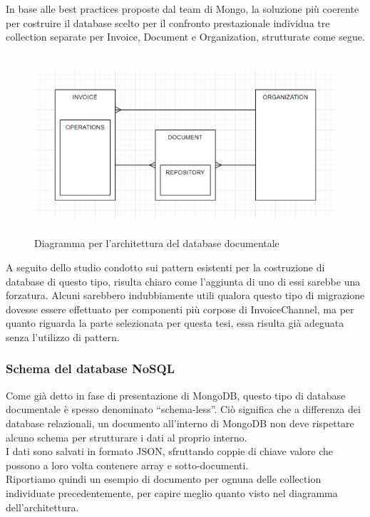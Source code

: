 \noindent In base alle best practices proposte dal team di Mongo, la soluzione più coerente per costruire il database scelto per il confronto prestazionale individua tre collection separate per Invoice, Document e Organization, strutturate come segue.\\

\begin{figure}[htbp]
\begin{center}
\includegraphics[height=18em]{immagini/ER-Mongo-IC.png}
\caption{Diagramma per l'architettura del database documentale}
\end{center}
\end{figure}

\noindent A seguito dello studio condotto sui pattern esistenti per la costruzione di database di questo tipo, risulta chiaro come l'aggiunta di uno di essi sarebbe una forzatura. Alcuni sarebbero indubbiamente utili qualora questo tipo di migrazione dovesse essere effettuato per componenti più corpose di InvoiceChannel, ma per quanto riguarda la parte selezionata per questa tesi, essa risulta già adeguata senza l'utilizzo di pattern.

\subsubsection{Schema del database NoSQL}
Come già detto in fase di presentazione di MongoDB, questo tipo di database documentale è spesso denominato ``schema-less''. Ciò significa che a differenza dei database relazionali, un documento all'interno di MongoDB non deve rispettare alcuno schema per strutturare i dati al proprio interno.\\
I dati sono salvati in formato JSON, sfruttando coppie di chiave valore che possono a loro volta contenere array e sotto-documenti.\\
Riportiamo quindi un esempio di documento per ognuna delle collection individuate precedentemente, per capire meglio quanto visto nel diagramma dell'architettura.\\

